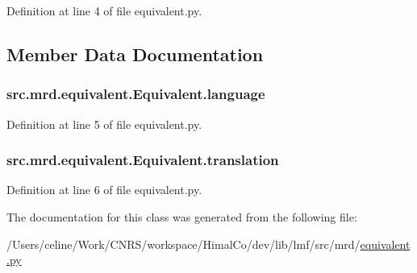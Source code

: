 Definition at line 4 of file equivalent.\+py.



\subsection{Member Data Documentation}
\hypertarget{classsrc_1_1mrd_1_1equivalent_1_1_equivalent_a827bb0b73adca115ffdf6f5a95f807bf}{
\subsubsection[{language}]{\setlength{\rightskip}{0pt plus 5cm}src.\+mrd.\+equivalent.\+Equivalent.\+language}}\label{classsrc_1_1mrd_1_1equivalent_1_1_equivalent_a827bb0b73adca115ffdf6f5a95f807bf}


Definition at line 5 of file equivalent.\+py.

\hypertarget{classsrc_1_1mrd_1_1equivalent_1_1_equivalent_a607911fadc9f5751ca553cb7c47d300f}{
\subsubsection[{translation}]{\setlength{\rightskip}{0pt plus 5cm}src.\+mrd.\+equivalent.\+Equivalent.\+translation}}\label{classsrc_1_1mrd_1_1equivalent_1_1_equivalent_a607911fadc9f5751ca553cb7c47d300f}


Definition at line 6 of file equivalent.\+py.



The documentation for this class was generated from the following file\+:\begin{DoxyCompactItemize}
\item 
/\+Users/celine/\+Work/\+C\+N\+R\+S/workspace/\+Himal\+Co/dev/lib/lmf/src/mrd/\hyperlink{equivalent_8py}{equivalent.\+py}\end{DoxyCompactItemize}

